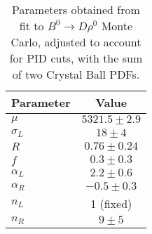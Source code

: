\begin{table}[h]
  \centering
  \begin{tabular}{lc}
      \toprule
      Parameter & Value \\
      \midrule
      $\mu$ & $5321.5 \pm 2.9$ \\
      $\sigma_L$ & $18 \pm 4$ \\
      $R$ & $0.76 \pm 0.24$ \\
      $f$ & $0.3 \pm 0.3$ \\
      $\alpha_L$ & $2.2 \pm 0.6$ \\
      $\alpha_R$ & $-0.5 \pm 0.3$ \\
$n_L$ & 1 (fixed) \\
      $n_R$ & $9 \pm 5$ \\
  \bottomrule
  \end{tabular}
  \caption{Parameters obtained from fit to $B^0 \to D\rho^0$ Monte  Carlo, adjusted to account for PID cuts, with the sum of two Crystal Ball PDFs.}
\label{tab:rho_mc_params}
\end{table}
